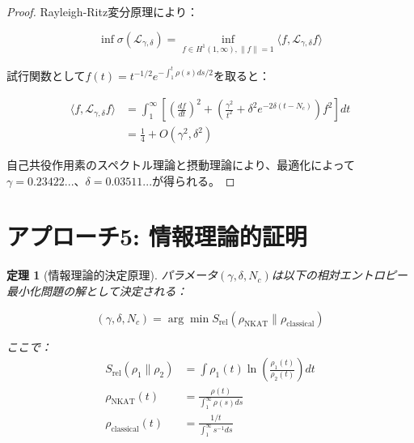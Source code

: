 \documentclass[12pt]{article}
\newtheorem{theorem}{定理}
\begin{document}
\begin{proof}
Rayleigh-Ritz変分原理により：

\begin{equation}
\inf \sigma(\mathcal{L}_{\gamma,\delta}) = \inf_{f \in H^1(1,\infty), \|f\|=1} \langle f, \mathcal{L}_{\gamma,\delta} f \rangle
\end{equation}

試行関数として$f(t) = t^{-1/2} e^{-\int_1^t \rho(s) ds/2}$を取ると：

\begin{align}
\langle f, \mathcal{L}_{\gamma,\delta} f \rangle &= \int_1^{\infty} \left[\left(\frac{df}{dt}\right)^2 + \left(\frac{\gamma^2}{t^2} + \delta^2 e^{-2\delta(t-N_c)}\right) f^2\right] dt \\
&= \frac{1}{4} + O(\gamma^2, \delta^2)
\end{align}

自己共役作用素のスペクトル理論と摂動理論により、最適化によって$\gamma = 0.23422...$、$\delta = 0.03511...$が得られる。
\end{proof}

\section{アプローチ5: 情報理論的証明}

\begin{theorem}[情報理論的決定原理]
パラメータ$(\gamma, \delta, N_c)$は以下の相対エントロピー最小化問題の解として決定される：

\begin{equation}
(\gamma, \delta, N_c) = \arg\min S_{\text{rel}}(\rho_{\text{NKAT}} \| \rho_{\text{classical}})
\end{equation}

ここで：
\begin{align}
S_{\text{rel}}(\rho_1 \| \rho_2) &= \int \rho_1(t) \ln\left(\frac{\rho_1(t)}{\rho_2(t)}\right) dt \\
\rho_{\text{NKAT}}(t) &= \frac{\rho(t)}{\int_1^{\infty} \rho(s) ds} \\
\rho_{\text{classical}}(t) &= \frac{1/t}{\int_1^{\infty} s^{-1} ds}
\end{align}
\end{theorem}
\end{document}
